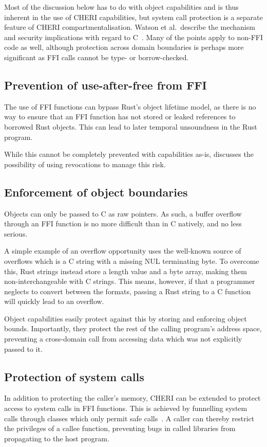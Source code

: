 \documentclass[dissertation.tex]{subfiles}
\begin{document}
Most of the discussion below has to do with object capabilities and is
thus inherent in the use of CHERI capabilities, but system call
protection is a separate feature of CHERI compartmentalisation.
Watson et al.\ describe the mechanism and security implications with
regard to C~\cite{cheri2015}.
Many of the points apply to non-FFI code as well, although protection
across domain boundaries is perhaps more significant as FFI calls cannot
be type- or borrow-checked.

\subsection{Prevention of use-after-free from FFI}
The use of FFI functions can bypass Rust's object lifetime model, as
there is no way to ensure that an FFI function has not stored or leaked
references to borrowed Rust objects.
This can lead to later temporal unsoundness in the Rust program.

While this cannot be completely prevented with capabilities as-is,
 discusses the possibility of using
revocations to manage this risk.

\subsection{Enforcement of object boundaries}
Objects can only be passed to C as raw pointers.
As such, a buffer overflow through an FFI function is no more difficult
than in C natively, and no less serious.

A simple example of an overflow opportunity uses the well-known source
of overflows which is a C string with a missing NUL terminating byte.
To overcome this, Rust strings instead store a length value and a byte
array, making them non-interchangeable with C strings.
This means, however, if that a programmer neglects to convert between
the formats, passing a Rust string to a C function will quickly lead to
an overflow.

Object capabilities easily protect against this by storing and enforcing
object bounds.
Importantly, they protect the rest of the calling program's address
space, preventing a cross-domain call from accessing data which was not
explicitly passed to it.

\subsection{Protection of system calls}
In addition to protecting the caller's memory, CHERI can be extended to
protect access to system calls in FFI functions.
This is achieved by funnelling system calls through classes which only
permit safe calls~\cite{cheri2015}.
A caller can thereby restrict the privileges of a callee function,
preventing bugs in called libraries from propagating to the host
program.
\end{document}
